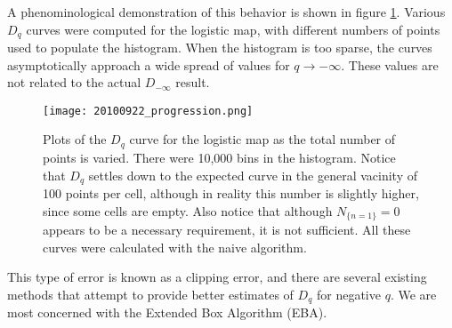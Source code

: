 % 


A phenominological demonstration of this behavior is shown in figure \ref{2010_09_sparse1d}.  Various $D_q$ curves were computed for the logistic map, with different numbers of points used to populate the histogram.  When the histogram is too sparse, the curves asymptotically approach a wide spread of values for $q\to -\infty$.  These values are not related to the actual $D_{-\infty}$ result.

\begin{figure}[!ht]
\texttt{[image: 20100922\_progression.png]}
\caption[Plots demonstrating the effect of sparse data on $D_q$ convergence.]{Plots of the $D_q$ curve for the logistic map as the total number of points is varied.  There were 10,000 bins in the histogram.  Notice that $D_q$ settles down to the expected curve in the general vacinity of 100 points per cell, although in reality this number is slightly higher, since some cells are empty.  Also notice that although $N_{\{n=1\}}=0$ appears to be a necessary requirement, it is not sufficient.  All these curves were calculated with the naive algorithm. \label{2010_09_sparse1d}}
\end{figure}

This type of error is known as a clipping error, %
and there are several existing methods that attempt to provide better estimates of $D_q$ for negative $q$.  We are most concerned with the Extended Box Algorithm (EBA).  